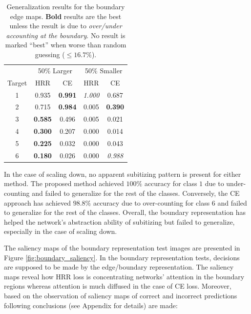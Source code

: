 \documentclass[letterpaper]{article} %
\begin{document}
\begin{table}[!htbp]%
\centering
\begin{tabular}{@{}ccccc@{}}
\toprule
       & \multicolumn{2}{c}{50\% Larger} & \multicolumn{2}{c}{50\% Smaller } \\ \cmidrule(lr){2-3} \cmidrule(lr){4-5}
Target & HRR                 & CE                  & HRR                  & CE                  \\ \midrule
1      & 0.935               & \textbf{0.991}      & \textit{1.000}       & 0.687               \\
2      & 0.715               & \textbf{0.984}      & 0.005                & \textbf{0.390}      \\
3      & \textbf{0.585}      & 0.496               & 0.005                & 0.021               \\
4      & \textbf{0.300}      & 0.207               & 0.000                & 0.014               \\
5      & \textbf{0.225}      & 0.032               & 0.000                & 0.043               \\
6      & \textbf{0.180}      & 0.026               & 0.000                & \textit{0.988}      \\ \bottomrule
\end{tabular}
\caption{Generalization results for the boundary edge maps. \textbf{Bold} results are the best unless the result is due to  \textit{over/under accounting at the boundary}. No result is marked ``best'' when worse than random guessing ($\leq 16.7\%$).}
\label{tab:boundaryResults}
\end{table}

In the case of scaling down, no apparent subitizing pattern is present for either method. The proposed method achieved $100\%$ accuracy for class $1$ due to under-counting and failed to generalize for the rest of the classes. Conversely, the CE approach has achieved $98.8\%$ accuracy due to over-counting for class $6$ and failed to generalize for the rest of the classes. Overall, the boundary representation has helped the network’s abstraction ability of subitizing but failed to generalize, especially in the case of scaling down.
\par
The saliency maps of the boundary representation test images are presented in Figure \ref{fig:boundary_saliency}. In the boundary representation tests, decisions are supposed to be made by the edge/boundary representation. The saliency maps reveal how HRR loss is concentrating networks' attention in the boundary regions whereas attention is much diffused in the case of CE loss. Moreover, based on the observation of saliency maps of correct and incorrect predictions following conclusions (see Appendix for details) are made:
\end{document}
